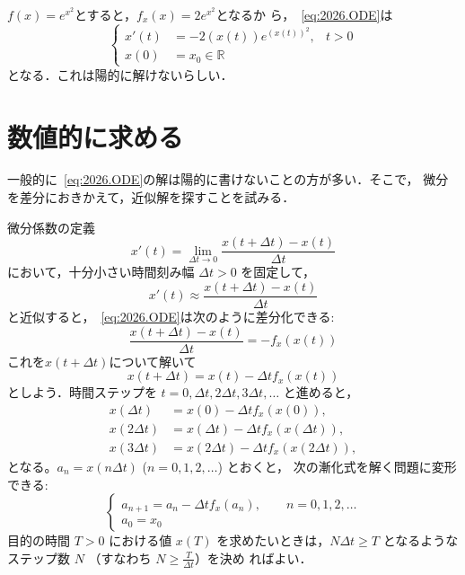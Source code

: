  \begin{example}
  $f(x) = e^{x^2}$とすると，$f_x(x) =2e^{x^2}$となるか
  ら，~\eqref{eq:2026.ODE}は
  \begin{equation}
   \left\{
    \begin{aligned}
     x'(t) &= -2(x(t))e^{(x(t))^2}, & t > 0 \\
     x(0) &= x_0 \in \mathbb{R}
    \end{aligned}
	 \right.
  \end{equation}
  となる．これは陽的に解けないらしい．
 \end{example}


 \section{数値的に求める}

 一般的に~\eqref{eq:2026.ODE}の解は陽的に書けないことの方が多い．そこで，
 微分を差分におきかえて，近似解を探すことを試みる．

 微分係数の定義
 \begin{equation}
  x'(t)
   =
   \lim_{\Delta t \rightarrow 0}
   \frac{x(t+\Delta t) - x(t)}{\Delta t}
 \end{equation}
 において，十分小さい時間刻み幅 $\Delta t > 0$ を固定して，
 \begin{equation}
  \label{eq:2006.Derivative_Approx}
  x'(t) \approx \frac{x(t+\Delta t) - x(t)}{\Delta t}
 \end{equation}
 と近似すると，~\eqref{eq:2026.ODE}は次のように差分化できる:
 \begin{equation}
  \frac{x(t+\Delta t) - x(t)}{\Delta t} = -f_x(x(t))
 \end{equation}
 これを$x(t+\Delta t)$について解いて
 \begin{equation}
  x(t+\Delta t) = x(t) - \Delta t f_x(x(t))
 \end{equation}
 としよう．時間ステップを $t = 0, \Delta t, 2\Delta t, 3\Delta t, \dots$
 と進めると，
 \begin{align}
  x(\Delta t) &= x(0) - \Delta t f_x(x(0)), \\
  x(2\Delta t) &= x(\Delta t) - \Delta t f_x(x(\Delta t)), \\
  x(3\Delta t) &= x(2\Delta t) - \Delta t f_x(x(2\Delta t)),
 \end{align}
 となる。$a_n = x(n\Delta t)$ ($n = 0, 1, 2, \dots$) とおくと，
 次の漸化式を解く問題に変形できる:
\begin{equation}
 \label{eq:2006.FDM}
  \begin{cases}
   a_{n+1} = a_n - \Delta t f_x(a_n) ,\qquad n=0,1,2,\ldots\\
   a_0 = x_0
  \end{cases}
  \tag{RE}
\end{equation}
目的の時間 $T > 0$ における値 $x(T)$ を求めたいときは，$N\Delta t \ge T$
となるようなステップ数 $N$ （すなわち $N \ge \frac{T}{\Delta t}$）を決め
ればよい．

